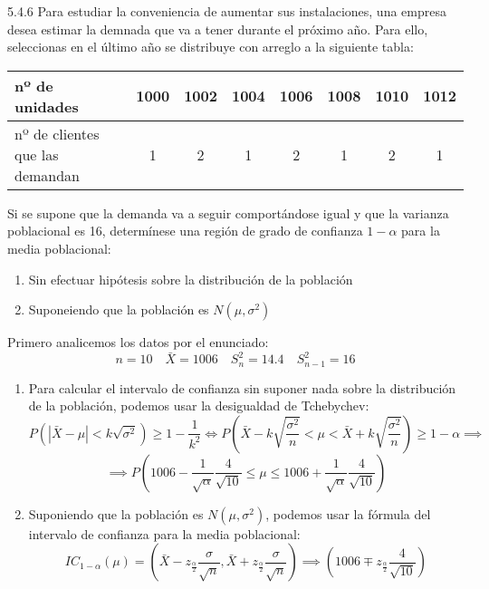 \begin{problem}{5.4.6}
    Para estudiar la conveniencia de aumentar sus instalaciones, una empresa desea estimar la demnada que va a tener durante el próximo año. Para ello, seleccionas en el último año se distribuye con arreglo a la siguiente tabla: 
    \begin{center}
        \begin{tabular}{|l|c|c|c|c|c|c|c|}
        \hline
        nº de unidades & 1000 & 1002 & 1004 & 1006 & 1008 & 1010 & 1012 \\
        \hline
        nº de clientes que las demandan & 1 & 2 & 1 & 2 & 1 & 2 & 1 \\
        \hline
        \end{tabular}
    \end{center}
    Si se supone que la demanda va a seguir comportándose igual y que la varianza poblacional es 16, determínese una región de grado de confianza $1 - \alpha$ para la media poblacional: 
    \begin{enumerate}
        \item Sin efectuar hipótesis sobre la distribución de la población
        \item Suponeiendo que la población es $N(\mu, \sigma^2)$
    \end{enumerate}
\end{problem}
\begin{sol}
    Primero analicemos los datos por el enunciado: 
    $$n = 10 \quad \bar{X} = 1006 \quad S^2_{n} = 14.4 \quad S^2_{n-1} = 16$$
    \begin{enumerate}
        \item Para calcular el intervalo de confianza sin suponer nada sobre la distribución de la población, podemos usar la desigualdad de Tchebychev:
        $$P\left(|\bar{X} - \mu| < k \sqrt{\sigma^2}\right) \geq 1 - \frac{1}{k^2} \iff P\left(\bar{X} - k \sqrt{\frac{\sigma^2}{n}} < \mu < \bar{X} + k \sqrt{\frac{\sigma^2}{n}}\right) \geq 1 - \alpha \implies$$
        $$ \implies P\left(1006 - \frac{1}{\sqrt{\alpha}}\frac{4}{\sqrt{10}} \leq \mu \leq 1006 + \frac{1}{\sqrt{\alpha}}\frac{4}{\sqrt{10}}\right)$$
        \item Suponiendo que la población es $N(\mu, \sigma^2)$, podemos usar la fórmula del intervalo de confianza para la media poblacional:
        $$IC_{1 - \alpha}(\mu) = \left(\bar{X} - z_{\frac{\alpha}{2}}\frac{\sigma}{\sqrt{n}}, \bar{X} + z_{\frac{\alpha}{2}}\frac{\sigma}{\sqrt{n}}\right) \implies \left(1006 \mp z_{\frac{\alpha}{2}}\frac{4}{\sqrt{10}}\right)$$
    \end{enumerate}
\end{sol}
